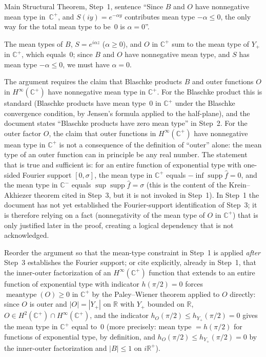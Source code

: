 \documentclass[11pt]{article}
\newcommand{\R}{\mathbb{R}}
\newcommand{\C}{\mathbb{C}}
\begin{document}
\begin{description}[leftmargin=0pt]
\item[Location:]
Main Structural Theorem, Step~1, sentence
``Since $B$ and $O$ have nonneg\-a\-tive mean type in~$\C^+$, and
$S(iy)=e^{-\alpha y}$ contributes mean type $-\alpha\le 0$, the only way for
the total mean type to be~$0$ is $\alpha=0$''.

\item[Claim as written:]
The mean types of $B$, $S=e^{i\alpha z}$ ($\alpha\ge 0$), and $O$ in $\C^+$ sum
to the mean type of $Y_+$ in $\C^+$, which equals~$0$; since $B$ and $O$ have
nonneg\-a\-tive mean type, and $S$ has mean type $-\alpha\le 0$, we must have
$\alpha=0$.

\item[What is relied on but not established in the text:]
The argument requires the claim that Blaschke products $B$ and outer functions $O$
in $H^\infty(\C^+)$ have nonneg\-a\-tive mean type in $\C^+$.
For the Blaschke product this is standard (Blaschke products have mean type~$0$
in $\C^+$ under the Blaschke convergence condition, by Jensen's formula applied
to the half-plane), and the document states ``Blaschke products have zero mean
type'' in Step~2.
For the outer factor $O$, the claim that outer functions in $H^\infty(\C^+)$ have
nonneg\-a\-tive mean type in $\C^+$ is not a consequence of the definition of
``outer'' alone: the mean type of an outer function can in principle be any real
number.
The statement that is true and sufficient is: for an entire function of exponential
type with one-sided Fourier support $[0,\sigma]$, the mean type in $\C^+$ equals
$-\inf\operatorname{supp}\hat f=0$, and the mean type in $\C^-$ equals
$\sup\operatorname{supp}\hat f=\sigma$ (this is the content of the Krein--Akhiezer
theorem cited in Step~3, but it is not invoked in Step~1).
In Step~1 the document has not yet established the Fourier-support identification
of Step~3; it is therefore relying on a fact (nonnegativity of the mean type of
$O$ in $\C^+$) that is only justified later in the proof, creating a logical
dependency that is not acknowledged.

\item[What would establish it:]
Reorder the argument so that the mean-type constraint in Step~1 is applied
\emph{after} Step~3 establishes the Fourier support; or cite explicitly, already
in Step~1, that the inner-outer factorization of an $H^\infty(\C^+)$ function that
extends to an entire function of exponential type with indicator
$h(\pi/2)=0$ forces $\operatorname{mean type}(O)\ge 0$ in $\C^+$ by the
Paley--Wiener theorem applied to $O$ directly:
since $O$ is outer and $|O|=|Y_+|$ on $\R$ with $Y_+$ bounded on $\R$,
$O\in H^2(\C^+)\cap H^\infty(\C^+)$, and the indicator $h_O(\pi/2)\le h_{Y_+}(\pi/2)=0$
gives the mean type in $\C^+$ equal to~$0$ (more precisely: mean type
$=h(\pi/2)$ for functions of exponential type, by definition, and
$h_O(\pi/2)\le h_{Y_+}(\pi/2)=0$ by the inner-outer factorization and $|B|\le 1$ on
$i\R^+$).
\end{description}
\end{document}
